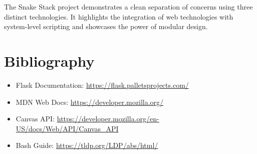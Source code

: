 \documentclass[12pt]{article}
\begin{document}
The Snake Stack project demonstrates a clean separation of concerns using three distinct technologies. It highlights the integration of web technologies with system-level scripting and showcases the power of modular design.

\section{Bibliography}

\begin{itemize}
    \item Flask Documentation: \url{https://flask.palletsprojects.com/}
    \item MDN Web Docs: \url{https://developer.mozilla.org/}
    \item Canvas API: \url{https://developer.mozilla.org/en-US/docs/Web/API/Canvas_API}
    \item Bash Guide: \url{https://tldp.org/LDP/abs/html/}
\end{itemize}
\end{document}
